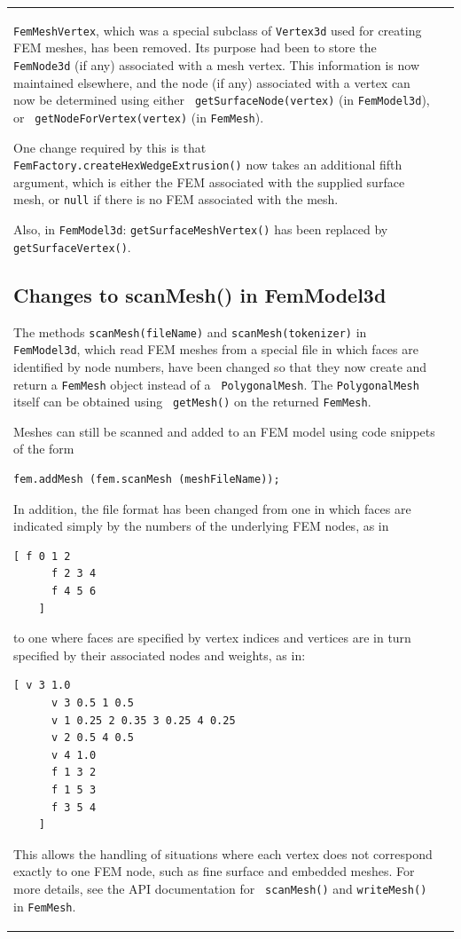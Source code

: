 \documentclass{article}
\begin{document}
\begin{tabular}{ll}
{\tt FemMeshVertex}, which was a special subclass of {\tt Vertex3d}
used for creating FEM meshes, has been removed. Its purpose had been
to store the {\tt FemNode3d} (if any) associated with a mesh vertex.
This information is now maintained elsewhere, and the node (if any)
associated with a vertex can now be determined using either {\tt
getSurfaceNode(vertex)} (in {\tt FemModel3d}), or {\tt
getNodeForVertex(vertex)} (in {\tt FemMesh}).

One change required by this is that {\tt
FemFactory.createHexWedgeExtrusion()} now takes an additional fifth
argument, which is either the FEM associated with the supplied surface
mesh, or {\tt null} if there is no FEM associated with the mesh.

Also, in {\tt FemModel3d}: {\tt getSurfaceMeshVertex()} has been
replaced by {\tt getSurfaceVertex()}.

\subsection*{Changes to scanMesh() in FemModel3d}

The methods {\tt scanMesh(fileName)} and {\tt scanMesh(tokenizer)} in
{\tt FemModel3d}, which read FEM meshes from a special file in which
faces are identified by node numbers, have been changed so that they
now create and return a {\tt FemMesh} object instead of a {\tt
PolygonalMesh}. The {\tt PolygonalMesh} itself can be obtained using {\tt
getMesh()} on the returned {\tt FemMesh}.

Meshes can still be scanned and added to an FEM model using
code snippets of the form
%
\begin{lstlisting}[]
   fem.addMesh (fem.scanMesh (meshFileName));
\end{lstlisting}
%

In addition, the file format has been changed from one in which faces
are indicated simply by the numbers of the underlying FEM nodes, as in
%
\begin{lstlisting}[]
    [ f 0 1 2
      f 2 3 4
      f 4 5 6
    ]
\end{lstlisting}
%
to one where faces are specified by vertex indices and vertices are in
turn specified by their associated nodes and weights, as in:
%
\begin{lstlisting}[]
    [ v 3 1.0
      v 3 0.5 1 0.5
      v 1 0.25 2 0.35 3 0.25 4 0.25
      v 2 0.5 4 0.5
      v 4 1.0
      f 1 3 2
      f 1 5 3
      f 3 5 4
    ]
\end{lstlisting}
%
This allows the handling of situations where each vertex does not
correspond exactly to one FEM node, such as fine surface and embedded
meshes. For more details, see the API documentation for {\tt
scanMesh()} and {\tt writeMesh()} in {\tt FemMesh}.


\end{tabular}
\end{document}
